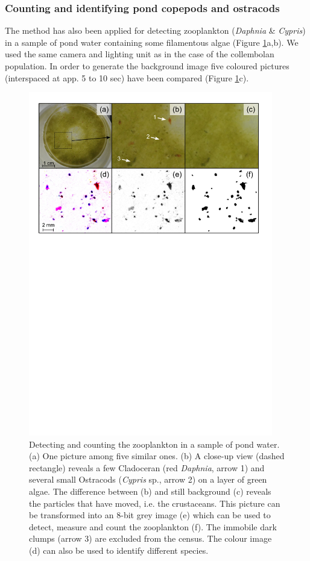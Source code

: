 \subsubsection{Counting and identifying pond copepods and ostracods}

The method has also been applied for detecting zooplankton (\textit{Daphnia} \&
\textit{Cypris}) in a sample of pond water containing some filamentous algae
(Figure \ref{Fig21-3}a,b). We used the same camera and lighting unit as in the case of the collembolan population.
In order to generate the background image five coloured pictures (interspaced at
app. 5 to 10 sec) have been compared (Figure \ref{Fig21-3}c).

\begin{figure}[!h] %
\centering
\includegraphics[width=0.95\textwidth]{2_Methodo/Fig/3_Daphnies.pdf} 
\caption[ Detecting and counting the zooplankton in a sample of pond water]{ Detecting and counting the zooplankton in a sample of pond water. (a) One
picture among five similar ones. (b) A close-up view (dashed rectangle) reveals
a few Cladoceran (red \textit{Daphnia}, arrow 1) and several small Ostracods (\textit{Cypris} sp.,
arrow 2) on a layer of green algae. The difference between (b) and still
background (c) reveals the particles that have moved, i.e. the crustaceans. This
picture can be transformed into an 8-bit grey image (e) which can be used to
detect, measure and count the zooplankton (f). The immobile dark clumps (arrow
3) are excluded from the census. The colour image (d) can also be used to
identify different species.}
\label{Fig21-3}
\end{figure}

